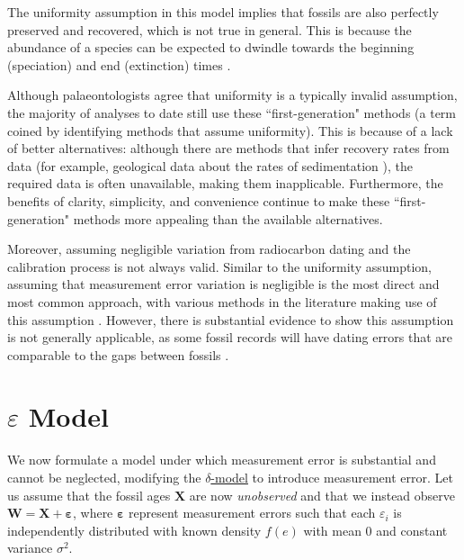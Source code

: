 The uniformity assumption in this model implies that fossils are also perfectly preserved and recovered, which is not true in general. This is because the abundance of a species can be expected to dwindle towards the beginning (speciation) and end (extinction) times \cite{Lee2010, WangMarshall2016}.

Although palaeontologists agree that uniformity is a typically invalid assumption, the majority of analyses to date still use these ``first-generation" methods (a term coined by \citet{WangMarshall2016} identifying methods that assume uniformity). This is because of a lack of better alternatives: although there are methods that infer recovery rates from data (for example, geological data about the rates of sedimentation \cite{Holland2003}), the required data is often unavailable, making them inapplicable. Furthermore, the benefits of clarity, simplicity, and convenience continue to make these ``first-generation" methods more appealing than the available alternatives.

Moreover, assuming negligible variation from radiocarbon dating and the calibration process is not always valid. Similar to the uniformity assumption, assuming that measurement error variation is negligible is the most direct and most common approach, with various methods in the literature making use of this assumption \cite{Mcinerny2006, Solow1993, Strauss1989, Weiss1999, Wang2016}. However, there is substantial evidence to show this assumption is not generally applicable, as some fossil records will have dating errors that are comparable to the gaps between fossils \cite{Solow2006}.

\clearpage

\section{$\varepsilon$ Model}\label{section: varepsilon-model}

We now formulate a model under which measurement error is substantial and cannot be neglected, modifying the \hyperref[model: no-measurement-error]{$\delta$-model} to introduce measurement error. Let us assume that the fossil ages $\bm{X}$ are now \textit{unobserved} and that we instead observe $\bm{W} = \bm{X} + \bm{\varepsilon}$, where $\bm{\varepsilon}$ represent measurement errors such that each $\varepsilon_i$ is independently distributed with known density $f(e)$ with mean 0 and constant variance $\sigma^2$.


